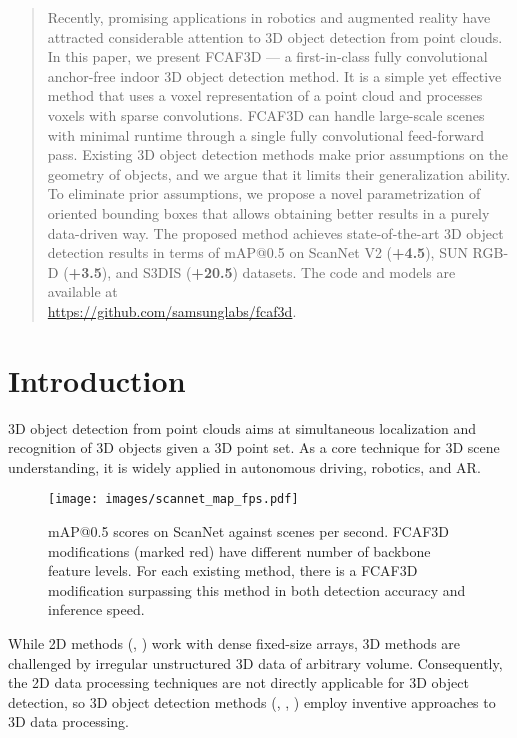 \documentclass[runningheads]{llncs}
\begin{document}
\begin{abstract}
Recently, promising applications in robotics and augmented reality have attracted considerable attention to 3D object detection from point clouds. In this paper, we present FCAF3D --- a first-in-class fully convolutional anchor-free indoor 3D object detection method. It is a simple yet effective method that uses a voxel representation of a point cloud and processes voxels with sparse convolutions. FCAF3D can handle large-scale scenes with minimal runtime through a single fully convolutional feed-forward pass. Existing 3D object detection methods make prior assumptions on the geometry of objects, and we argue that it limits their generalization ability. To eliminate prior assumptions, we propose a novel parametrization of oriented bounding boxes that allows obtaining better results in a purely data-driven way. The proposed method achieves state-of-the-art 3D object detection results in terms of mAP@0.5 on ScanNet V2 (\textbf{+4.5}), SUN RGB-D (\textbf{+3.5}), and S3DIS (\textbf{+20.5}) datasets. The code and models are available at \\\url{https://github.com/samsunglabs/fcaf3d}.

\end{abstract}

\section{Introduction}

3D object detection from point clouds aims at simultaneous localization and recognition of 3D objects given a 3D point set. As a core technique for 3D scene understanding, it is widely applied in autonomous driving, robotics, and AR.

\begin{figure}[h!]
    \centering
        \texttt{[image: images/scannet\_map\_fps.pdf]}
    \caption{mAP@0.5 scores on ScanNet against scenes per second. FCAF3D modifications (marked red) have different number of backbone feature levels. For each existing method, there is a FCAF3D modification surpassing this method in both detection accuracy and inference speed.}
    \label{fig:fps}
\end{figure}

While 2D methods (\cite{tian2019fcos}, \cite{zhang2020atss}) work with dense fixed-size arrays, 3D methods are challenged by irregular unstructured 3D data of arbitrary volume. Consequently, the 2D data processing techniques are not directly applicable for 3D object detection, so 3D object detection methods (\cite{gwak2020gsdn}, \cite{qi2019votenet}, \cite{misra20213detr}) employ inventive approaches to 3D data processing. 
\end{document}
